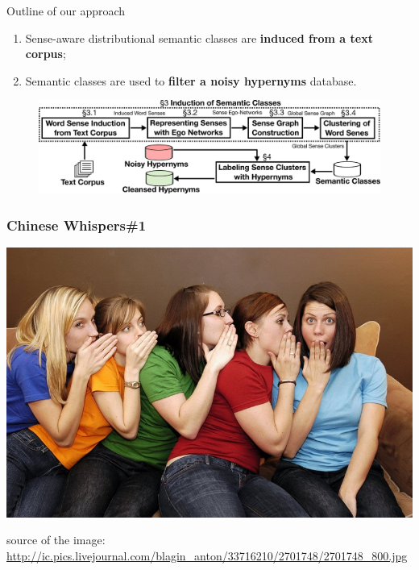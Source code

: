 \documentclass[usenames,dvipsnames]{beamer}
\begin{document}
\begin{frame}{Outline of our approach}



\begin{enumerate}
	\item Sense-aware distributional semantic classes are \textbf{induced from a text corpus}; 
	\item Semantic classes are used to \textbf{filter a noisy hypernyms} database. 
 
\end{enumerate}

\pause 


\begin{figure}
  \centering
  \includegraphics[width=.99\textwidth]{figures/outline}
  \end{figure}



\end{frame}


\begin{frame}[fragile]
\frametitle{Chinese Whispers\#1}
\begin{center}
 \includegraphics[height=0.52\textwidth]{figures/cw}
 
  {\tiny * source of the image: \url{http://ic.pics.livejournal.com/blagin_anton/33716210/2701748/2701748_800.jpg}}
 \end{center}
\end{frame}
\end{document}
